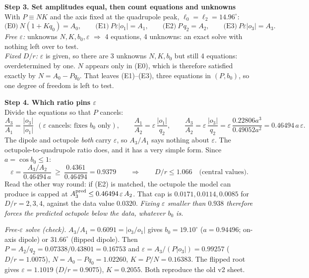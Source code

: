 \documentclass[10pt]{article}
\begin{document}
\medskip\textbf{Step 3. Set amplitudes equal, then count equations and unknowns}\\
With $P\equiv NK$ and the axis fixed at the quadrupole peak, $\ell_0=\ell_2=14.96^\circ$:
\[
\text{(E0)}\ N(1+Kq_0)=A_0,\qquad \text{(E1)}\ P\varepsilon|o_1|=A_1,\qquad \text{(E2)}\ P\,q_2=A_2,\qquad \text{(E3)}\ P\varepsilon|o_3|=A_3 .
\]
\emph{Free $\varepsilon$:} unknowns $N,K,b_0,\varepsilon$ $\Rightarrow$ 4 equations, 4 unknowns: an exact solve with nothing left over to test.\\
\emph{Fixed $D/r$:} $\varepsilon$ is given, so there are 3 unknowns $N,K,b_0$ but still 4 equations: overdetermined by one.
$N$ appears only in (E0), which is therefore satisfied exactly by $N=A_0-Pq_0$. That leaves (E1)--(E3), three equations in $(P,b_0)$, so one degree of freedom is left to test.

\medskip\textbf{Step 4. Which ratio pins $\varepsilon$}\\
Divide the equations so that $P$ cancels:
\[
\frac{A_3}{A_1}=\frac{|o_3|}{|o_1|}\ \ (\varepsilon\text{ cancels: fixes }b_0\text{ only}),\qquad
\frac{A_1}{A_2}=\varepsilon\,\frac{|o_1|}{q_2},\qquad
\frac{A_3}{A_2}=\varepsilon\,\frac{|o_3|}{q_2}=\varepsilon\,\frac{0.22806a^3}{0.49052a^2}=0.46494\,a\,\varepsilon .
\]
The dipole and octupole \emph{both} carry $\varepsilon$, so $A_3/A_1$ says nothing about $\varepsilon$. The octupole-to-quadrupole ratio does, and it has a very simple form. Since $a=\cos b_0\le1$:
\[
\varepsilon=\frac{A_3/A_2}{0.46494\,a}\ \ge\ \frac{0.4361}{0.46494}=0.9379\qquad\Longrightarrow\qquad D/r\le1.066\quad\text{(central values).}
\]
Read the other way round: if (E2) is matched, the octupole the model can produce is capped at $A_3^{\rm pred}\le0.46494\,\varepsilon\,A_2$. That cap is
$0.0171, 0.0114, 0.0085$ for $D/r=2,3,4$, against the data value $0.0320$.
\emph{Fixing $\varepsilon$ smaller than $0.938$ therefore forces the predicted octupole below the data, whatever $b_0$ is.}

\emph{Free-$\varepsilon$ solve (check).} $A_3/A_1=0.6091=|o_3/o_1|$ gives $b_0=19.10^\circ$ ($a=0.94496$; on-axis dipole) or $31.66^\circ$ (flipped dipole). Then
$P=A_2/q_2=0.07338/0.43801=0.16753$ and $\varepsilon=A_3/(P|o_3|)=0.99257$ ($D/r=1.0075$),
$N=A_0-Pq_0=1.02260$, $K=P/N=0.16383$. The flipped root gives $\varepsilon=1.1019$ ($D/r=0.9075$), $K=0.2055$. Both reproduce the old v2 sheet.
\end{document}
